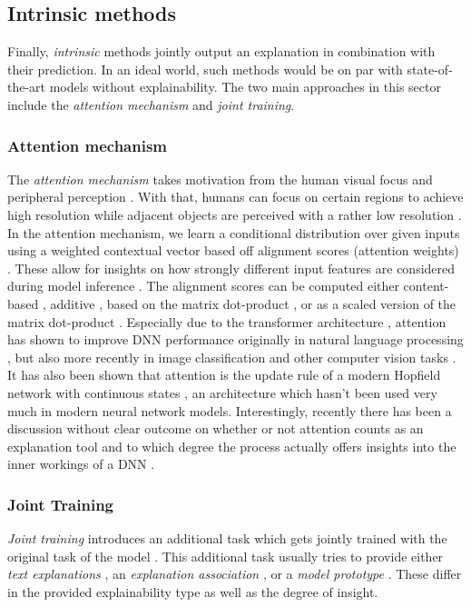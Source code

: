 \subsection{Intrinsic methods}
Finally, \emph{intrinsic} methods jointly output an explanation in combination with their prediction. In an ideal world, such methods would be on par with state-of-the-art models without explainability. The two main approaches in this sector include the \emph{attention mechanism} and \emph{joint training}.

\subsubsection{Attention mechanism}
The \emph{attention mechanism} \citep{VaswaniSPUJGKP17} takes motivation from the human visual focus and peripheral
perception \citep{schmidt2019recurrent}. With that, humans can focus on certain regions to achieve high resolution while adjacent objects are perceived with a rather low resolution \citep{schmidt2019recurrent}. In the attention mechanism, we learn a conditional distribution over given inputs using a weighted contextual vector based off alignment scores (attention weights) \citep{xie2020explainable}. These allow for insights on how strongly different input features are considered during model inference \citep{xie2020explainable}. The alignment scores can be computed either content-based \citep{graves2014neural}, additive \citep{BahdanauCB14}, based on the matrix dot-product \citep{LuongPM15}, or as a scaled version of the matrix dot-product \citep{VaswaniSPUJGKP17}. Especially due to the transformer architecture \citep{VaswaniSPUJGKP17}, attention has shown to improve DNN performance originally in natural language processing \citep{DevlinCLT19, brown2020language, lan2019albert}, but also more recently in image classification and other computer vision tasks \citep{AnwarB19, ZamirAKHK0020}. It has also been shown that attention is the update rule of a modern Hopfield network with continuous states \citep{ramsauer2020hopfield}, an architecture which hasn't been used very much in modern neural network models. Interestingly, recently there has been a discussion without clear outcome on whether or not attention counts as an explanation tool and to which degree the process actually offers insights into the inner workings of a DNN \citep{JainW19, WiegreffeP19}.


\subsubsection{Joint Training}
\emph{Joint training} introduces an additional task which gets jointly trained with the original task of the model \citep{xie2020explainable}. This additional task usually tries to provide either \emph{text explanations} \citep{HindWCCDMRV19, CamburuRLB18, HendricksARDSD16, ZellersBFC19}, an \emph{explanation association} \citep{DongSZZ17, LeiBJ16, IyerLL0SS18, Alvarez-MelisJ18}, or a \emph{model prototype} \citep{LiLCR18, ChenLTBRS19}. These differ in the provided explainability type as well as the degree of insight. 

